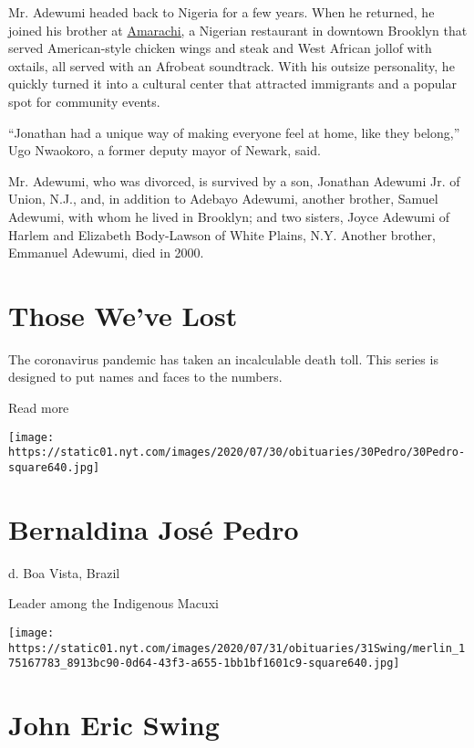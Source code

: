 Mr. Adewumi headed back to Nigeria for a few years. When he returned, he
joined his brother at \href{https://amarachi325.com/}{Amarachi,} a
Nigerian restaurant in downtown Brooklyn that served American-style
chicken wings and steak and West African jollof with oxtails, all served
with an Afrobeat soundtrack. With his outsize personality, he quickly
turned it into a cultural center that attracted immigrants and a popular
spot for community events.

``Jonathan had a unique way of making everyone feel at home, like they
belong,'' Ugo Nwaokoro, a former deputy mayor of Newark, said.

Mr. Adewumi, who was divorced, is survived by a son, Jonathan Adewumi
Jr. of Union, N.J., and, in addition to Adebayo Adewumi, another
brother, Samuel Adewumi, with whom he lived in Brooklyn; and two
sisters, Joyce Adewumi of Harlem and Elizabeth Body-Lawson of White
Plains, N.Y. Another brother, Emmanuel Adewumi, died in 2000.

\href{https://www.nytimes.com/interactive/2020/obituaries/people-died-coronavirus-obituaries.html?action=click\&pgtype=Article\&state=default\&region=BELOW_MAIN_CONTENT\&context=covid_obits_promo}{}

\hypertarget{those-weve-lost}{%
\section{Those We've Lost}\label{those-weve-lost}}

The coronavirus pandemic has taken an incalculable death toll. This
series is designed to put names and faces to the numbers.

Read more

\texttt{[image: https://static01.nyt.com/images/2020/07/30/obituaries/30Pedro/30Pedro-square640.jpg]}

\hypertarget{bernaldina-josuxe9-pedro}{%
\section{Bernaldina José Pedro}\label{bernaldina-josuxe9-pedro}}

d. Boa Vista, Brazil

Leader among the Indigenous Macuxi

\texttt{[image: https://static01.nyt.com/images/2020/07/31/obituaries/31Swing/merlin\_175167783\_8913bc90-0d64-43f3-a655-1bb1bf1601c9-square640.jpg]}

\hypertarget{john-eric-swing}{%
\section{John Eric Swing}\label{john-eric-swing}}

